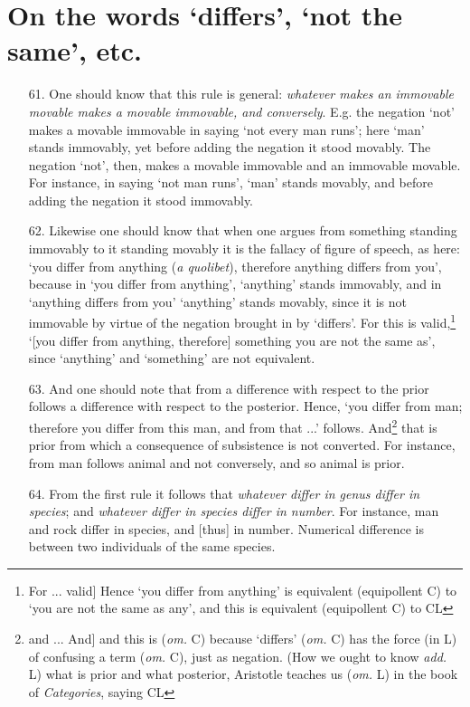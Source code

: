 \section{On the words `differs', `not the same', etc.}
\begin{itemize}
\item[61.] One should know that this rule is general: \textit{whatever makes an immovable movable makes a movable immovable, and conversely}. E.g. the negation `not' makes a movable immovable in saying `not every man runs'; here `man' stands immovably, yet before adding the negation it stood movably. The negation `not', then, makes a movable immovable and an immovable movable. For instance, in saying `not man runs', `man' stands movably, and before adding the negation it stood immovably.
\item[62.] Likewise one should know that when one argues from something standing immovably to it standing movably it is the fallacy of figure of speech, as here: `you differ from anything (\textit{a quolibet}), therefore anything differs from you', because in `you differ from anything', `anything' stands immovably, and in `anything differs from you' `anything' stands movably, since it is not immovable by virtue of the negation brought in by `differs'. For this is valid,\footnote{For ... valid] Hence `you differ from anything' is equivalent (equipollent C) to `you are not the same as any', and this is equivalent (equipollent C) to CL} `[you differ from anything, therefore] something you are not the same as', since `anything' and `something' are not equivalent.
\item[63.] And one should note that from a difference with respect to the prior follows a difference with respect to the posterior. Hence, `you differ from man; therefore you differ from this man, and from that ...' follows. And\footnote{and ... And] and this is (\textit{om.} C) because `differs' (\textit{om.} C) has the force (in L) of confusing a term (\textit{om.} C), just as negation. (How we ought to know \textit{add.} L) what is prior and what posterior, Aristotle teaches us (\textit{om.} L) in the book of \textit{Categories}, saying CL} that is prior from which a consequence of subsistence is not converted. For instance, from man follows animal and not conversely, and so animal is prior.
\item[64.] From the first rule it follows that \textit{whatever differ in genus differ in species}; and \textit{whatever differ in species differ in number}. For instance, man and rock differ in species, and [thus] in number. Numerical difference is between two individuals of the same species.

\end{itemize}
